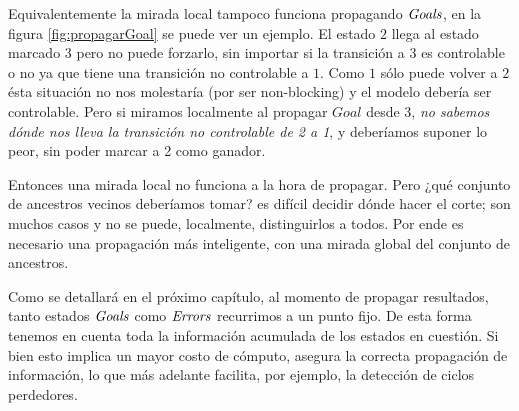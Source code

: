 Equivalentemente la mirada local tampoco funciona propagando $\mathit{Goals}$, en la figura \ref{fig:propagarGoal} se puede ver un ejemplo. El estado $2$ llega al estado marcado $3$ pero no puede forzarlo, sin importar si la transición a $3$ es controlable o no ya que tiene una transición no controlable a $1$. Como $1$ sólo puede volver a $2$ ésta situación no nos molestaría (por ser non-blocking) y el modelo debería ser controlable. Pero si miramos localmente al propagar $Goal$ desde $3$, \textit{no sabemos dónde nos lleva la transición no controlable de 2 a 1}, y deberíamos suponer lo peor, sin poder marcar a 2 como ganador.

Entonces una mirada local no funciona a la hora de propagar. Pero ¿qué conjunto de ancestros vecinos deberíamos tomar? es difícil decidir dónde hacer el corte; son muchos casos y no se puede, localmente, distinguirlos a todos. Por ende es necesario una propagación más inteligente, con una mirada global del conjunto de ancestros.

Como se detallará en el próximo capítulo, al momento de propagar resultados, tanto estados $\mathit{Goals}$ como $\mathit{Errors}$ recurrimos a un punto fijo. De esta forma tenemos en cuenta toda la información acumulada de los estados en cuestión. Si bien esto implica un mayor costo de cómputo, asegura la correcta propagación de información, lo que más adelante facilita, por ejemplo, la detección de ciclos perdedores.\\


